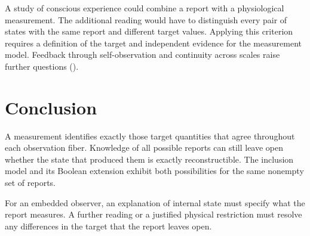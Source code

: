 A study of conscious experience could combine a report with a physiological measurement. The additional reading would have to distinguish every pair of states with the same report and different target values. Applying this criterion requires a definition of the target and independent evidence for the measurement model. Feedback through self-observation and continuity across scales raise further questions ().

\section{Conclusion}
\label{sec:mainconclusion}
A measurement identifies exactly those target quantities that agree throughout each observation fiber. Knowledge of all possible reports can still leave open whether the state that produced them is exactly reconstructible. The inclusion model and its Boolean extension exhibit both possibilities for the same nonempty set of reports.

For an embedded observer, an explanation of internal state must specify what the report measures. A further reading or a justified physical restriction must resolve any differences in the target that the report leaves open.
